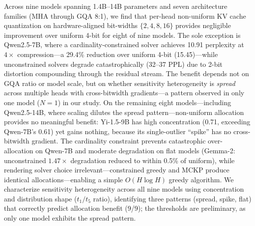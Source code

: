 Across nine models spanning 1.4B--14B parameters and seven architecture families (MHA through GQA 8:1), we find that per-head non-uniform KV cache quantization on hardware-aligned bit-widths $\{2,4,8,16\}$ provides negligible improvement over uniform 4-bit for eight of nine models.
The sole exception is Qwen2.5-7B, where a cardinality-constrained solver achieves 10.91 perplexity at $4\times$ compression---a 29.4\% reduction over uniform 4-bit (15.45)---while unconstrained solvers degrade catastrophically (32--37 PPL) due to 2-bit distortion compounding through the residual stream.
The benefit depends not on GQA ratio or model scale, but on whether sensitivity heterogeneity is \emph{spread} across multiple heads with cross-bitwidth gradients---a pattern observed in only one model ($N{=}1$) in our study.
On the remaining eight models---including Qwen2.5-14B, where scaling dilutes the spread pattern---non-uniform allocation provides no meaningful benefit: Yi-1.5-9B has high concentration (0.71, exceeding Qwen-7B's 0.61) yet gains nothing, because its single-outlier ``spike'' has no cross-bitwidth gradient.
The cardinality constraint prevents catastrophic over-allocation on Qwen-7B and moderate degradation on flat models (Gemma-2: unconstrained $1.47\times$ degradation reduced to within 0.5\% of uniform), while rendering solver choice irrelevant---constrained greedy and MCKP produce identical allocations---enabling a simple $O(H\log H)$ greedy algorithm.
We characterize sensitivity heterogeneity across all nine models using concentration and distribution shape ($t_1/t_5$ ratio), identifying three patterns (spread, spike, flat) that correctly predict allocation benefit (9/9); the thresholds are preliminary, as only one model exhibits the spread pattern.
